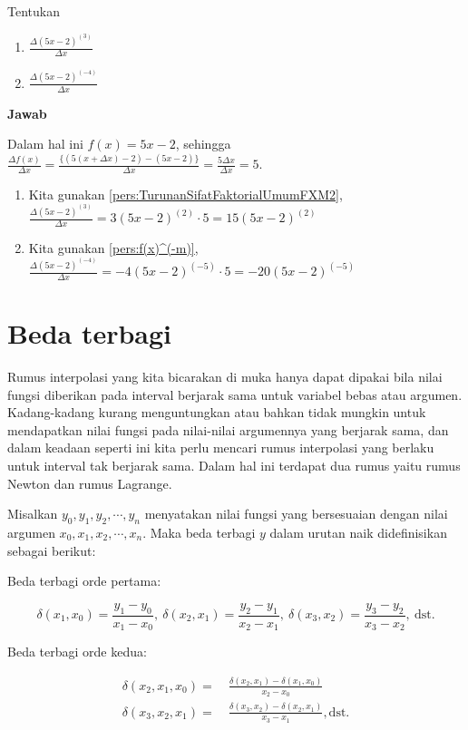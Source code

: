 \begin{exmp}\end{exmp}
Tentukan
\begin{enumerate}
\item $\frac{\Delta (5x-2)^{(3)}}{\Delta x}$
\item $\frac{\Delta (5x-2)^{(-4)}}{\Delta x}$
\end{enumerate}

\textbf{Jawab}

Dalam hal ini $f(x)=5x-2$, sehingga $\frac{\Delta f(x)}{\Delta x} = \frac{\{(5(x+\Delta x)-2)-(5x-2)\}}{\Delta x} = \frac{5 \Delta x}{\Delta x} = 5$.
\begin{enumerate}
\item Kita gunakan \ref{pers:TurunanSifatFaktorialUmumFXM2}, $\frac{\Delta (5x-2)^{(3)}}{\Delta x} = 3(5x-2)^{(2)}\cdot 5 = 15(5x-2)^{(2)}$
\item Kita gunakan \ref{pers:f(x)^(-m)}, $\frac{\Delta (5x-2)^{(-4)}}{\Delta x} = -4 (5x-2)^{(-5)} \cdot 5 = -20(5x-2)^{(-5)}$
\end{enumerate}

\section{Beda terbagi}
Rumus interpolasi yang kita bicarakan di muka hanya dapat dipakai bila nilai fungsi diberikan pada interval berjarak sama untuk variabel bebas atau argumen. Kadang-kadang kurang menguntungkan atau bahkan tidak mungkin untuk mendapatkan nilai fungsi pada nilai-nilai argumennya yang berjarak sama, dan dalam keadaan seperti ini kita perlu mencari rumus interpolasi yang berlaku untuk interval tak berjarak sama. Dalam hal ini terdapat dua rumus yaitu rumus Newton dan rumus Lagrange.

Misalkan $y_0, y_1, y_2, \cdots, y_n$ menyatakan nilai fungsi yang bersesuaian dengan nilai argumen $x_0, x_1, x_2, \cdots, x_n$. Maka beda terbagi $y$ dalam urutan naik didefinisikan sebagai berikut:

Beda terbagi orde pertama:

\begin{equation*}
\delta(x_1, x_0) = \frac{y_1-y_0}{x_1-x_0}, ~\delta(x_2, x_1) = \frac{y_2-y_1}{x_2-x_1}, ~\delta(x_3,x_2) = \frac{y_3 - y_2}{x_3 - x_2},~ \text{dst.}
\end{equation*}

Beda terbagi orde kedua:

\begin{equation*}
\begin{split}
\delta(x_2, x_1, x_0) =~& \frac{\delta(x_2,x_1)-\delta(x_1,x_0)}{x_2 - x_0}\\
\delta(x_3, x_2, x_1) =~& \frac{\delta(x_3,x_2)-\delta(x_2,x_1)}{x_3 - x_1}, \text{dst.}
\end{split}
\end{equation*}

